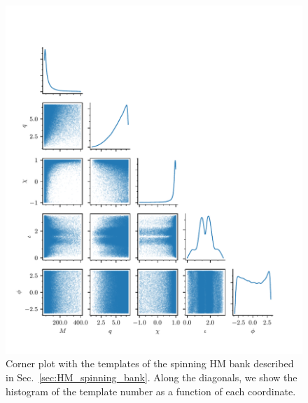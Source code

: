 \documentclass[twocolumn,showpacs,preprintnumbers,nofootinbib,prd,
superscriptaddress,10pt]{revtex4-2}
\begin{document}
\begin{figure}
	\centering
	\includegraphics[scale = 1.]{corner_HM_spinning}
	\caption{Corner plot with the templates of the spinning HM bank described in Sec.~\ref{sec:HM_spinning_bank}. Along the diagonals, we show the histogram of the template number as a function of each coordinate.}
	\label{fig:corner_HM_spinning}
\end{figure}

	
	
\end{document}
